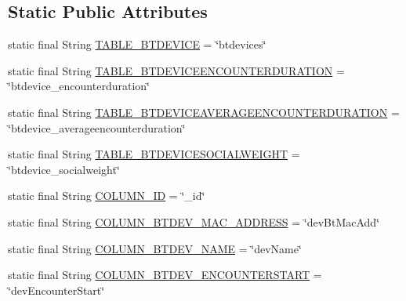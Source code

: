 \subsection*{Static Public Attributes}
\begin{DoxyCompactItemize}
\item 
static final String \hyperlink{classcom_1_1copelabs_1_1oiframework_1_1socialproximity_1_1_s_q_lite_helper_a1c11ba652a7d7221c90f773c4edb2af3}{T\+A\+B\+L\+E\+\_\+\+B\+T\+D\+E\+V\+I\+C\+E} = \char`\"{}btdevices\char`\"{}
\item 
static final String \hyperlink{classcom_1_1copelabs_1_1oiframework_1_1socialproximity_1_1_s_q_lite_helper_ab31b56a0eac0e440f57ad05a777f42be}{T\+A\+B\+L\+E\+\_\+\+B\+T\+D\+E\+V\+I\+C\+E\+E\+N\+C\+O\+U\+N\+T\+E\+R\+D\+U\+R\+A\+T\+I\+O\+N} = \char`\"{}btdevice\+\_\+encounterduration\char`\"{}
\item 
static final String \hyperlink{classcom_1_1copelabs_1_1oiframework_1_1socialproximity_1_1_s_q_lite_helper_acfb9d1512f69c1299ca39bf979ae7911}{T\+A\+B\+L\+E\+\_\+\+B\+T\+D\+E\+V\+I\+C\+E\+A\+V\+E\+R\+A\+G\+E\+E\+N\+C\+O\+U\+N\+T\+E\+R\+D\+U\+R\+A\+T\+I\+O\+N} = \char`\"{}btdevice\+\_\+averageencounterduration\char`\"{}
\item 
static final String \hyperlink{classcom_1_1copelabs_1_1oiframework_1_1socialproximity_1_1_s_q_lite_helper_ad91da6d89af9550e074a14a62f3366b1}{T\+A\+B\+L\+E\+\_\+\+B\+T\+D\+E\+V\+I\+C\+E\+S\+O\+C\+I\+A\+L\+W\+E\+I\+G\+H\+T} = \char`\"{}btdevice\+\_\+socialweight\char`\"{}
\item 
static final String \hyperlink{classcom_1_1copelabs_1_1oiframework_1_1socialproximity_1_1_s_q_lite_helper_a42da605a2e3ade18adf5dd701eb48b06}{C\+O\+L\+U\+M\+N\+\_\+\+I\+D} = \char`\"{}\+\_\+id\char`\"{}
\item 
static final String \hyperlink{classcom_1_1copelabs_1_1oiframework_1_1socialproximity_1_1_s_q_lite_helper_aa664c2d0219f93cc556b30e4b48954c1}{C\+O\+L\+U\+M\+N\+\_\+\+B\+T\+D\+E\+V\+\_\+\+M\+A\+C\+\_\+\+A\+D\+D\+R\+E\+S\+S} = \char`\"{}dev\+Bt\+Mac\+Add\char`\"{}
\item 
static final String \hyperlink{classcom_1_1copelabs_1_1oiframework_1_1socialproximity_1_1_s_q_lite_helper_adedd7238a8b391cf633df141dbc1f913}{C\+O\+L\+U\+M\+N\+\_\+\+B\+T\+D\+E\+V\+\_\+\+N\+A\+M\+E} = \char`\"{}dev\+Name\char`\"{}
\item 
static final String \hyperlink{classcom_1_1copelabs_1_1oiframework_1_1socialproximity_1_1_s_q_lite_helper_a8e8c6e04e4faa05d62f318698f021cbe}{C\+O\+L\+U\+M\+N\+\_\+\+B\+T\+D\+E\+V\+\_\+\+E\+N\+C\+O\+U\+N\+T\+E\+R\+S\+T\+A\+R\+T} = \char`\"{}dev\+Encounter\+Start\char`\"{}

\end{DoxyCompactItemize}
